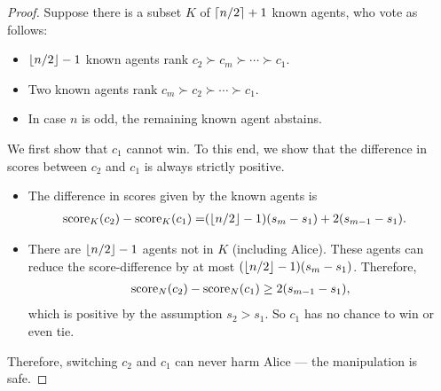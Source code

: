 \begin{proof}
Suppose there is a subset $K$ of $\left\lceil n/2 \right\rceil+1$ known agents, who vote as follows:
\begin{itemize}
\item $\left\lfloor n/2 \right\rfloor-1$ known agents rank $c_2 \succ c_m \succ \cdots \succ c_1$.
\item Two known agents rank $c_m \succ c_2 \succ
\cdots \succ c_1$. 
\item In case $n$ is odd, the remaining known agent abstains.
\end{itemize}
We first show that $c_1$ cannot win. To this end, we show that the difference in scores between $c_2$ and $c_1$ is always strictly positive.
\begin{itemize}
\item The difference in scores given by the known agents is 
\begin{align*}
\operatorname{score}_K(c_2)-\operatorname{score}_K(c_1) =
&
(\left\lfloor n/2 \right\rfloor-1)(s_m-s_1) 
+ 2(s_{m-1}-s_1).
\end{align*}
\item There are
$\left\lfloor n/2 \right\rfloor-1$ agents not in $K$ (including Alice).
These agents can reduce the score-difference by at most 
$(\left\lfloor n/2 \right\rfloor-1)(s_m-s_1)$.
Therefore, 
\begin{align*}
\operatorname{score}_N(c_2)-\operatorname{score}_N(c_1) \geq 2(s_{m-1}-s_1),
\end{align*}
which is positive 
by the assumption $s_2>s_1$.
So $c_1$ has no chance to win or even tie.
\end{itemize}
Therefore, switching $c_2$ and $c_1$ can never harm Alice --- the manipulation is safe.


\end{proof}
